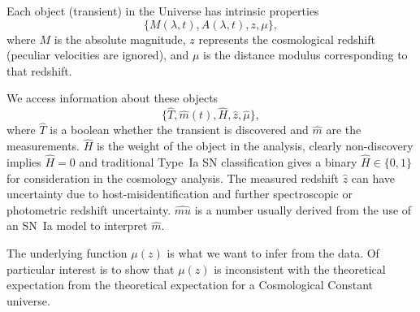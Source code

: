 \documentclass[preprint]{aastex}
\begin{document}
Each object (transient) in the Universe has intrinsic properties
\begin{equation}
\{M(\lambda,t), A(\lambda,t), z, \mu\},
\end{equation}
where $M$ is the absolute magnitude, $z$ represents the cosmological redshift (peculiar velocities are ignored), and $\mu$ is the distance modulus corresponding to that redshift.  

We access information about these objects
\begin{equation}
\{\hat{T}, \hat{m}(t), \hat{H}, \hat{z}, \hat{\mu}
\},
\end{equation}
where $\hat{T}$ is a boolean whether the transient is discovered and $\hat{m}$ are the measurements.
$\hat{H}$ is the weight of the object in the analysis, clearly non-discovery implies $\hat{H}=0$
and traditional Type~Ia SN classification gives a binary $\hat{H} \in \{0,1\}$ for consideration in
the cosmology analysis.  The measured redshift $\hat{z}$ can have uncertainty due to host-misidentification and further spectroscopic or photometric redshift uncertainty.  $\hat{mu}$
is a number usually derived from the use of an SN~Ia model to interpret $\hat{m}$.

The underlying function $\mu(z)$ is what we want to infer from the data.  Of particular interest
is to show that $\mu(z)$ is inconsistent with the theoretical expectation from the theoretical expectation for a Cosmological Constant universe.
\end{document}
